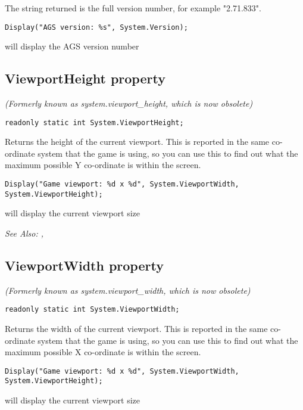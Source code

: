 The string returned is the full version number, for example "2.71.833".

\begin{verbatim}
Display("AGS version: %s", System.Version);
\end{verbatim}
will display the AGS version number


\subsection{ViewportHeight property}\label{System.ViewportHeight}%

\it{(Formerly known as system.viewport_height, which is now obsolete)}

\begin{verbatim}
readonly static int System.ViewportHeight;
\end{verbatim}
Returns the height of the current viewport. This is reported in the same co-ordinate system
that the game is using, so you can use this to find out what the maximum possible Y co-ordinate
is within the screen.

\begin{verbatim}
Display("Game viewport: %d x %d", System.ViewportWidth, System.ViewportHeight);
\end{verbatim}
will display the current viewport size

\it{See Also:} ,


\subsection{ViewportWidth property}\label{System.ViewportWidth}%

\it{(Formerly known as system.viewport_width, which is now obsolete)}

\begin{verbatim}
readonly static int System.ViewportWidth;
\end{verbatim}
Returns the width of the current viewport. This is reported in the same co-ordinate system
that the game is using, so you can use this to find out what the maximum possible X co-ordinate
is within the screen.

\begin{verbatim}
Display("Game viewport: %d x %d", System.ViewportWidth, System.ViewportHeight);
\end{verbatim}
will display the current viewport size

